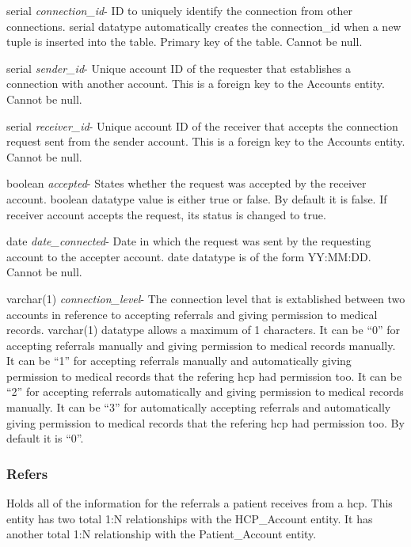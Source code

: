\begin{description}
\item serial \textit{connection\_id}-  ID to uniquely identify the connection from other connections. serial datatype automatically creates the connection\_id when a new tuple is inserted into the table.  Primary key of the table.  Cannot be null.
\item serial \textit{sender\_id}- Unique account ID of the requester that establishes a connection with another account.  This is a foreign key to the Accounts entity.  Cannot be null.  
\item serial \textit{receiver\_id}- Unique account ID of the receiver that accepts the connection request sent from the sender account.  This is a foreign key to the Accounts entity.  Cannot be null.
\item boolean \textit{accepted}- States whether the request was accepted by the receiver account.  boolean datatype value is either true or false.  By default it is false.  If receiver account accepts the request, its status is changed to true.
\item date \textit{date\_connected}- Date in which the request was sent by the requesting account to the accepter account.  date datatype is of the form YY:MM:DD.  Cannot be null.
\item varchar(1) \textit{connection\_level}- The connection level that is extablished between two accounts in reference to accepting referrals and giving permission to medical records.  varchar(1) datatype allows a maximum of 1 characters.  It can be ``0'' for accepting referrals manually and giving permission to medical records manually.  It can be ``1'' for accepting referrals manually and automatically giving permission to medical records that the refering hcp had permission too.  It can be ``2'' for accepting referrals automatically and giving permission to medical records manually.  It can be ``3'' for automatically accepting referrals and automatically giving permission to medical records that the refering hcp had permission too.  By default it is ``0''.
\end{description}

\subsubsection{Refers}
Holds all of the information for the referrals a patient receives from a hcp.  This entity has two total 1:N relationships with the HCP\_Account entity.  It has another total 1:N relationship with the Patient\_Account entity.

